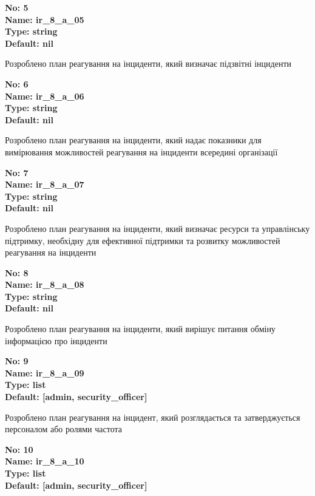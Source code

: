 \documentclass{article}
\begin{document}
{\footnotesize\bfseries
No: 5\\
Name: ir\_\allowbreak{}8\_\allowbreak{}a\_\allowbreak{}05\\
Type: string\\
Default: nil
}

{\footnotesize Розроблено план реагування на інциденти, який визначає підзвітні інциденти}


{\footnotesize\bfseries
No: 6\\
Name: ir\_\allowbreak{}8\_\allowbreak{}a\_\allowbreak{}06\\
Type: string\\
Default: nil
}

{\footnotesize Розроблено план реагування на інциденти, який надає показники для вимірювання можливостей реагування на інциденти всередині організації}


{\footnotesize\bfseries
No: 7\\
Name: ir\_\allowbreak{}8\_\allowbreak{}a\_\allowbreak{}07\\
Type: string\\
Default: nil
}

{\footnotesize Розроблено план реагування на інциденти, який визначає ресурси та управлінську підтримку, необхідну для ефективної підтримки та розвитку можливостей реагування на інциденти}


{\footnotesize\bfseries
No: 8\\
Name: ir\_\allowbreak{}8\_\allowbreak{}a\_\allowbreak{}08\\
Type: string\\
Default: nil
}

{\footnotesize Розроблено план реагування на інциденти, який вирішує питання обміну інформацією про інциденти}


{\footnotesize\bfseries
No: 9\\
Name: ir\_\allowbreak{}8\_\allowbreak{}a\_\allowbreak{}09\\
Type: list\\
Default: [\textquotedbl{}admin\textquotedbl{}, \textquotedbl{}security\_\allowbreak{}officer\textquotedbl{}]
}

{\footnotesize Розроблено план реагування на інцидент, який розглядається та затверджується персоналом або ролями частота}


{\footnotesize\bfseries
No: 10\\
Name: ir\_\allowbreak{}8\_\allowbreak{}a\_\allowbreak{}10\\
Type: list\\
Default: [\textquotedbl{}admin\textquotedbl{}, \textquotedbl{}security\_\allowbreak{}officer\textquotedbl{}]
}
\end{document}

